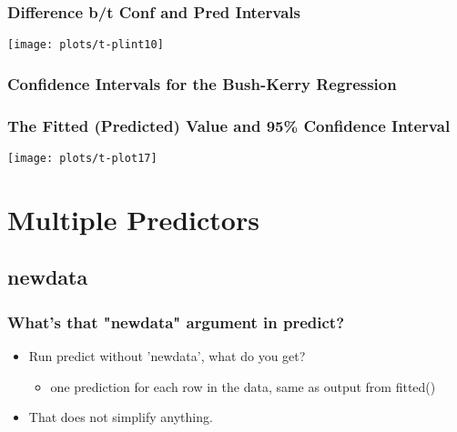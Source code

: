 \documentclass[10pt,english]{beamer}
\def\lyxframeend{} %
\begin{document}
\begin{frame}[containsverbatim]
\frametitle{Difference b/t Conf and Pred Intervals}

\texttt{[image: plots/t-plint10]}

\end{frame}

\begin{frame}[containsverbatim]
\frametitle{Confidence Intervals for the Bush-Kerry Regression}






\end{frame}

\begin{frame}
\frametitle{The Fitted (Predicted) Value and 95\% Confidence Interval}

\texttt{[image: plots/t-plot17]}

\end{frame}


\lyxframeend{}\section{Multiple Predictors}


\lyxframeend{}\subsection{newdata}

\begin{frame}[containsverbatim]
\frametitle{What's that "newdata" argument in predict?}
\begin{itemize}
\item Run predict without 'newdata', what do you get?

\begin{itemize}
\item one prediction for each row in the data, same as output from fitted()




\end{itemize}
\item That does not simplify anything. 
\end{itemize}
\end{frame}
\end{document}
